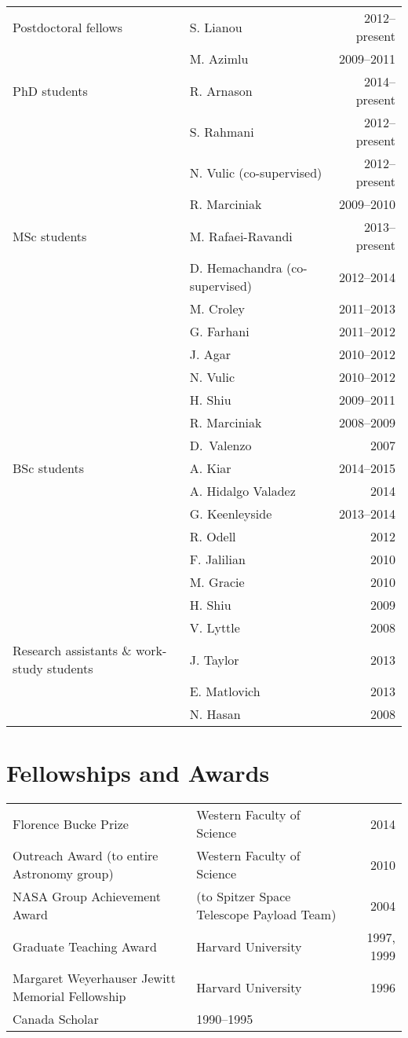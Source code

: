 \documentclass[12pt]{article}
\begin{document}
\begin{tabularx}{\textwidth}{p{5cm}Xr}
Postdoctoral fellows 
& S. Lianou & 2012--present\\
& M. Azimlu & 2009--2011\\
PhD students 
&  R. Arnason & 2014--present\\
&S. Rahmani& 2012--present \\
&N. Vulic (co-supervised) & 2012--present \\
&R. Marciniak & 2009--2010 \\
MSc students 
& M. Rafaei-Ravandi& 2013--present\\
& D. Hemachandra (co-supervised)& 2012--2014\\
& M. Croley& 2011--2013\\
& G. Farhani& 2011--2012\\
 & J. Agar& 2010--2012\\
& N. Vulic& 2010--2012\\
& H. Shiu& 2009--2011\\
& R. Marciniak& 2008--2009\\
& D.\ Valenzo& 2007\\
BSc students
& A. Kiar & 2014--2015\\
& A. Hidalgo Valadez & 2014\\
& G. Keenleyside& 2013--2014\\
& R. Odell& 2012\\
& F. Jalilian& 2010\\
& M. Gracie& 2010\\
& H. Shiu& 2009\\
& V. Lyttle& 2008\\
Research assistants \& work-study students
& J. Taylor& 2013\\
& E. Matlovich& 2013\\
& N. Hasan& 2008\\
\end{tabularx}

\section{Fellowships and Awards}

\begin{tabularx}{\textwidth}{lXr}
Florence Bucke Prize& Western Faculty of Science & 2014\\
Outreach Award (to entire Astronomy group)& Western Faculty of Science & 2010 \\
NASA Group Achievement Award &(to Spitzer Space Telescope Payload Team)& 2004\\
Graduate Teaching Award& Harvard University & 1997, 1999 \\
Margaret Weyerhauser Jewitt Memorial Fellowship& Harvard University & 1996\\
Canada Scholar &1990--1995\\
\end{tabularx}
\end{document}
